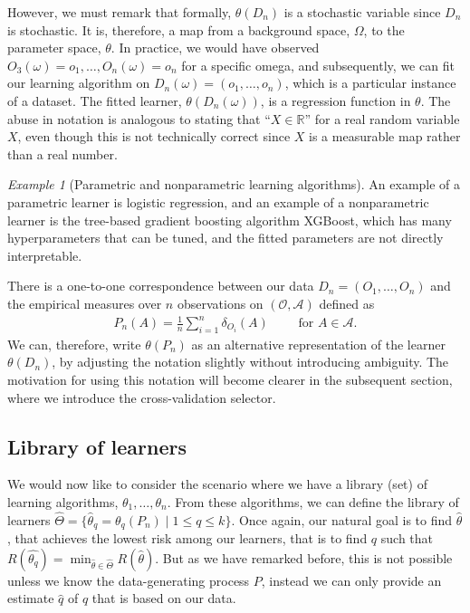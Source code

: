 \documentclass[11pt, a4paper]{article}
\theoremstyle{definition}
\theoremstyle{remark}
\newtheorem{example}{Example}
\newcommand{\q}{q}
\newcommand{\ml}{k}
\newcommand{\btheta}{\theta}
\newcommand{\lib}{\hat{\Theta}}
\begin{document}
However, we must remark that formally, $ \btheta(D_n) $ is a stochastic variable since $ D_n $ is stochastic. It is, therefore, a map from a background space, $ \Omega $, to the parameter space, $ \btheta $. In practice, we would have observed $ O_3(\omega) = o_1, \dots, O_n(\omega) = o_n $ for a specific omega, and subsequently, we can fit our learning algorithm on $ D_n(\omega) = (o_1 , \dots , o_n) $, which is a particular instance of a dataset. The fitted learner, $ \btheta(D_n(\omega)) $, is a regression function in $ \btheta $. The abuse in notation is analogous to stating that ``$ X \in \mathbb{R} $'' for a real random variable $ X $, even though this is not technically correct since $ X $ is a measurable map rather than a real number.
\begin{example}[Parametric and nonparametric learning algorithms]
    An example of a parametric learner is logistic regression, and an example of a nonparametric learner is the tree-based gradient boosting algorithm XGBoost, which has many hyperparameters that can be tuned, and the fitted parameters are not directly interpretable.  
\end{example}
There is a one-to-one correspondence between our data $ D_n = (O_1 , \ldots, O_n) $ and the empirical measures over $ n $ observations on $ (\mathcal{O} , \mathcal{A}) $ defined as
\begin{align*}
    P_n(A) = \frac{1}{n} \sum_{i = 1}^{n} \delta_{O_i}(A)\qquad \text{ for } A \in \mathcal{A}.
\end{align*}
We can, therefore, write $ \btheta(P_n)$ as an alternative representation of the learner $\btheta(D_n)$, by adjusting the notation slightly without introducing ambiguity. The motivation for using this notation will become clearer in the subsequent section, where we introduce the cross-validation selector.

\subsection{Library of learners}
We would now like to consider the scenario where we have a library (set) of learning algorithms, $ \btheta_1 , \ldots, \btheta_n $. From these algorithms, we can define the library of learners $ \lib = \{ \hat{\btheta}_\q = \btheta_{\q}(P_n) \mid 1 \leq \q \leq \ml \} $. Once again, our natural goal is to find $ \hat{\btheta} $, that achieves the lowest risk among our learners, that is to find $ \q $ such that $ R( \hat{\btheta_{\q}} ) = \min_{ \hat{\btheta}  \in \hat{\Theta} } R( \hat{\btheta} ) $. But as we have remarked before, this is not possible unless we know the data-generating process $ P $, instead we can only provide an estimate $ \hat{\q} $ of $ q $ that is based on our data.
\end{document}
